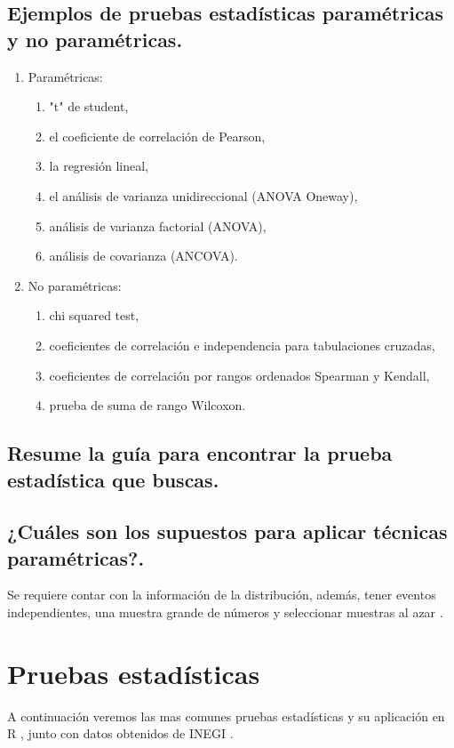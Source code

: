 \documentclass[]{article}
\begin{document}
\subsection{Ejemplos de pruebas estadísticas	paramétricas y no paramétricas.}
\begin{enumerate}    
\item Paramétricas:

  \begin{enumerate}
    \item "t" de student,
    \item el coeficiente de correlación de Pearson,
    \item la regresión lineal,
    \item el análisis de varianza unidireccional (ANOVA Oneway), 
    \item análisis de varianza factorial (ANOVA), 
    \item análisis de covarianza (ANCOVA).

  \end{enumerate}
  
\item No paramétricas:
  \begin{enumerate}
    \item chi squared test,
    \item coeficientes de correlación e independencia para tabulaciones cruzadas,
    \item coeficientes de correlación por rangos ordenados Spearman y Kendall,
    \item prueba de suma de rango Wilcoxon.
  \end{enumerate}
\end{enumerate}


\subsection{Resume la guía para encontrar la prueba estadística que buscas.}

\subsection{¿Cuáles son los supuestos para aplicar técnicas paramétricas?.}
Se requiere contar con la información de la distribución, además, tener eventos independientes, una muestra grande de números y seleccionar muestras al azar \cite{Articulo_2}.

\section{Pruebas estadísticas}
A continuación veremos las mas comunes pruebas estadísticas \cite{Articulo_0} y su aplicación en R         \cite{rproject}, junto con datos obtenidos de INEGI \cite{inegi}.
\end{document}
